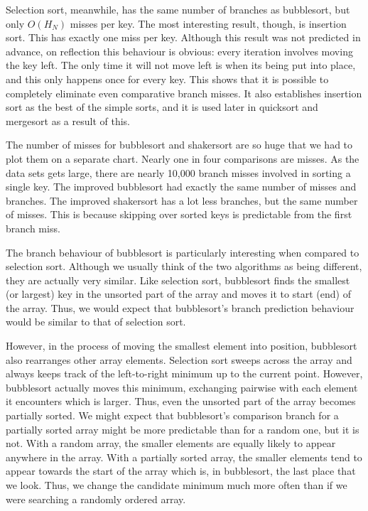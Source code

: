 Selection sort, meanwhile, has the same number of branches as bubblesort, but
only $O(H_N)$ misses per key. The most interesting result, though, is insertion
sort. This has exactly one miss per key. Although this result was not predicted
in advance, on reflection this behaviour is obvious: every iteration involves
moving the key left. The only time it will not move left is when its being put
into place, and this only happens once for every key. This shows that it is
possible to completely eliminate even comparative branch misses. It also
establishes insertion sort as the best of the simple sorts, and it is used later
in quicksort and mergesort as a result of this. \label{insertion is predictable}

The number of misses for bubblesort and shakersort are so huge that we had to
plot them on a separate chart. Nearly one in four comparisons are misses. As the
data sets gets large, there are nearly 10,000 branch misses involved in sorting
a single key. The improved bubblesort had exactly the same number of misses and
branches. The improved shakersort has a lot less branches, but the same number
of misses. This is because skipping over sorted keys is predictable from the
first branch miss.

The branch behaviour of bubblesort is particularly interesting when compared to
selection sort. Although we usually think of the two algorithms as being
different, they are actually very similar. Like selection sort, bubblesort finds
the smallest (or largest) key in the unsorted part of the array and moves it to
start (end) of the array. Thus, we would expect that bubblesort's branch
prediction behaviour would be similar to that of selection sort.

However, in the process of moving the smallest element into position, bubblesort
also rearranges other array elements. Selection sort sweeps across the array and
always keeps track of the left-to-right minimum up to the current point.
However, bubblesort actually moves this minimum, exchanging pairwise with each
element it encounters which is larger. Thus, even the unsorted part of the array
becomes partially sorted. We might expect that bubblesort's comparison branch
for a partially sorted array might be more predictable than for a random one,
but it is not. With a random array, the smaller elements are equally likely to
appear anywhere in the array. With a partially sorted array, the smaller
elements tend to appear towards the start of the array which is, in bubblesort,
the last place that we look. Thus, we change the candidate minimum much more
often than if we were searching a randomly ordered array.

